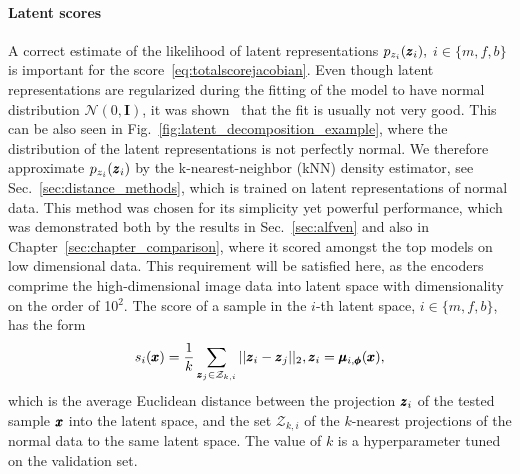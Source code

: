 \paragraph{Latent scores} A correct estimate of the likelihood of latent representations $p_{z_{i}}(\pmb{{z}}_i),$ $i \in \{m, f, b\}$ is important for the score~\eqref{eq:totalscorejacobian}. Even though latent representations are regularized during the fitting of the model to have normal distribution $\mathcal{N}(0,\textbf{I})$, it was shown~\cite{dai2019diagnosing} that the fit is usually not very good. This can be also seen in Fig.~\ref{fig:latent_decomposition_example}, where the distribution of the latent representations is not perfectly normal. We therefore approximate $p_{z_{i}}(\pmb{{z}}_i)$ by the k-nearest-neighbor (kNN) density estimator, see Sec.~\ref{sec:distance_methods}, which is trained on latent representations of normal data. This method was chosen for its simplicity yet powerful performance, which was demonstrated both by the results in Sec.~\ref{sec:alfven} and also in Chapter~\ref{sec:chapter_comparison}, where it scored amongst the top models on low dimensional data. This requirement will be satisfied here, as the encoders comprime the high-dimensional image data into latent space with dimensionality on the order of 10$^2$. The score of a sample in the $i$-th latent space, $i \in \lbrace m, f, b \rbrace$, has the form
\begin{equation} \label{eq:knnscore}
    s_{i}(\pmb{{x}}) = \frac{1}{k} \sum_{\pmb{{z}}_j \in \mathcal{Z}_{k,i}} \vert \vert \pmb{{z}}_i - \pmb{{z}}_j \vert \vert_2, \pmb{{z}}_i = \pmb{{\mu}}_{i,\pmb{{\phi}}}(\pmb{{x}}), 
\end{equation}
which is the average Euclidean distance between the projection $\pmb{{z}}_i$ of the tested sample $\pmb{{x}}$ into the latent space, and the set $\mathcal{Z}_{k,i}$ of the $k$-nearest projections of the normal data to the same latent space. The value of $k$ is a hyperparameter tuned on the validation set.

